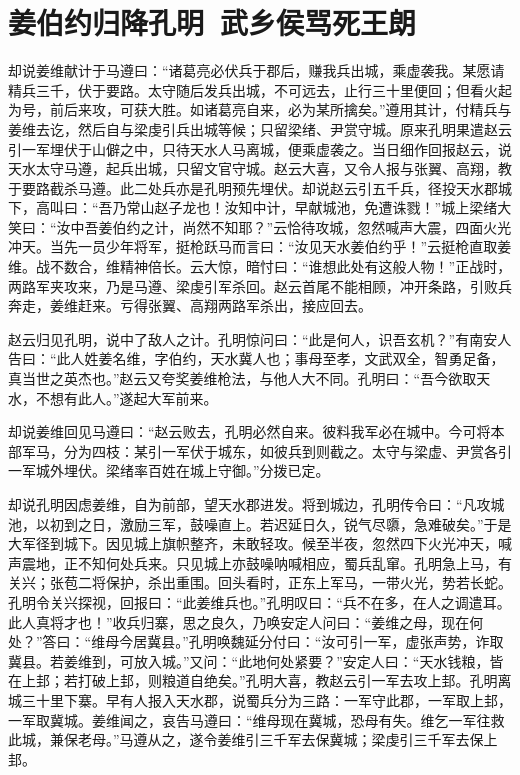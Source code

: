 \chapter{姜伯约归降孔明~武乡侯骂死王朗}

却说姜维献计于马遵曰：“诸葛亮必伏兵于郡后，赚我兵出城，乘虚袭我。某愿请精兵三千，伏于要路。太守随后发兵出城，不可远去，止行三十里便回；但看火起为号，前后来攻，可获大胜。如诸葛亮自来，必为某所擒矣。”遵用其计，付精兵与姜维去讫，然后自与梁虔引兵出城等候；只留梁绪、尹赏守城。原来孔明果遣赵云引一军埋伏于山僻之中，只待天水人马离城，便乘虚袭之。当日细作回报赵云，说天水太守马遵，起兵出城，只留文官守城。赵云大喜，又令人报与张翼、高翔，教于要路截杀马遵。此二处兵亦是孔明预先埋伏。却说赵云引五千兵，径投天水郡城下，高叫曰：“吾乃常山赵子龙也！汝知中计，早献城池，免遭诛戮！”城上梁绪大笑曰：“汝中吾姜伯约之计，尚然不知耶？”云恰待攻城，忽然喊声大震，四面火光冲天。当先一员少年将军，挺枪跃马而言曰：“汝见天水姜伯约乎！”云挺枪直取姜维。战不数合，维精神倍长。云大惊，暗忖曰：“谁想此处有这般人物！”正战时，两路军夹攻来，乃是马遵、梁虔引军杀回。赵云首尾不能相顾，冲开条路，引败兵奔走，姜维赶来。亏得张翼、高翔两路军杀出，接应回去。

赵云归见孔明，说中了敌人之计。孔明惊问曰：“此是何人，识吾玄机？”有南安人告曰：“此人姓姜名维，字伯约，天水冀人也；事母至孝，文武双全，智勇足备，真当世之英杰也。”赵云又夸奖姜维枪法，与他人大不同。孔明曰：“吾今欲取天水，不想有此人。”遂起大军前来。

却说姜维回见马遵曰：“赵云败去，孔明必然自来。彼料我军必在城中。今可将本部军马，分为四枝：某引一军伏于城东，如彼兵到则截之。太守与梁虚、尹赏各引一军城外埋伏。梁绪率百姓在城上守御。”分拨已定。

却说孔明因虑姜维，自为前部，望天水郡进发。将到城边，孔明传令曰：“凡攻城池，以初到之日，激励三军，鼓噪直上。若迟延日久，锐气尽隳，急难破矣。”于是大军径到城下。因见城上旗帜整齐，未敢轻攻。候至半夜，忽然四下火光冲天，喊声震地，正不知何处兵来。只见城上亦鼓噪呐喊相应，蜀兵乱窜。孔明急上马，有关兴；张苞二将保护，杀出重围。回头看时，正东上军马，一带火光，势若长蛇。孔明令关兴探视，回报曰：“此姜维兵也。”孔明叹曰：“兵不在多，在人之调遣耳。此人真将才也！”收兵归寨，思之良久，乃唤安定人问曰：“姜维之母，现在何处？”答曰：“维母今居冀县。”孔明唤魏延分付曰：“汝可引一军，虚张声势，诈取冀县。若姜维到，可放入城。”又问：“此地何处紧要？”安定人曰：“天水钱粮，皆在上邽；若打破上邽，则粮道自绝矣。”孔明大喜，教赵云引一军去攻上邽。孔明离城三十里下寨。早有人报入天水郡，说蜀兵分为三路：一军守此郡，一军取上邽，一军取冀城。姜维闻之，哀告马遵曰：“维母现在冀城，恐母有失。维乞一军往救此城，兼保老母。”马遵从之，遂令姜维引三千军去保冀城；梁虔引三千军去保上邽。

